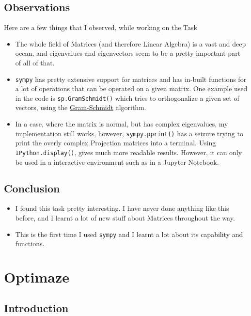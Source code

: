 \documentclass{report}
\begin{document}
\section{Observations}

Here are a few things that I observed, while working on the Task

\begin{itemize}
    \item The whole field of Matrices (and therefore Linear Algebra) is a vast and deep ocean, and eigenvalues and eigenvectors seem to be a pretty important part of all of that.
    \item \texttt{sympy} has pretty extensive support for matrices and has in-built functions for a lot of operations that can be operated on a given matrix. One example used in the code is \texttt{sp.GramSchmidt()} which tries to orthogonalize a given set of vectors, using the \href{https://en.wikipedia.org/wiki/Gram%E2%80%93Schmidt_process}{Gram-Schmidt} algorithm.
    \item In a case, where the matrix is normal, but has complex eigenvalues, my implementation still works, however, \texttt{sympy.pprint()} has a seizure trying to print the overly complex Projection matrices into a terminal. Using \texttt{IPython.display()}, gives much more readable results. However, it can only be used in a interactive environment such as in a Jupyter Notebook.
\end{itemize}

\section{Conclusion}

\begin{itemize}
    \item I found this task pretty interesting. I have never done anything like this before, and I learnt a lot of new stuff about Matrices throughout the way.
    \item This is the first time I used \texttt{sympy} and I learnt a lot about its capability and functions.
\end{itemize}

\newpage

\chapter{Optimaze}

\section{Introduction}
\end{document}
